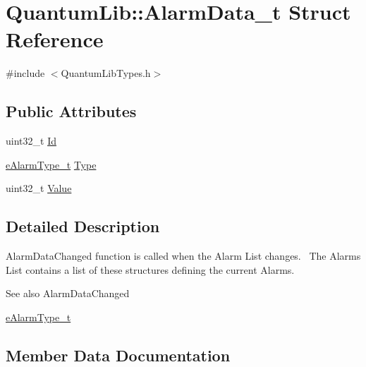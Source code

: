 \hypertarget{struct_quantum_lib_1_1_alarm_data__t}{}\section{Quantum\+Lib\+:\+:Alarm\+Data\+\_\+t Struct Reference}
\label{struct_quantum_lib_1_1_alarm_data__t}


{\ttfamily \#include $<$Quantum\+Lib\+Types.\+h$>$}

\subsection*{Public Attributes}
\begin{DoxyCompactItemize}
\item 
uint32\+\_\+t \mbox{\hyperlink{struct_quantum_lib_1_1_alarm_data__t_af08f24b08885bf73f3859685fae1662b}{Id}}
\item 
\mbox{\hyperlink{namespace_quantum_lib_a63dd10ad28888fcad99c7b8c5f155750}{e\+Alarm\+Type\+\_\+t}} \mbox{\hyperlink{struct_quantum_lib_1_1_alarm_data__t_afe1936d9430e6396dda2d40542e860ad}{Type}}
\item 
uint32\+\_\+t \mbox{\hyperlink{struct_quantum_lib_1_1_alarm_data__t_a067e24594147d5365c3b57e4920467bd}{Value}}
\end{DoxyCompactItemize}


\subsection{Detailed Description}
Alarm\+Data\+Changed function is called when the Alarm List changes.~\newline
The Alarms List contains a list of these structures defining the current Alarms. \begin{DoxySeeAlso}{See also}
Alarm\+Data\+Changed 

\mbox{\hyperlink{namespace_quantum_lib_a63dd10ad28888fcad99c7b8c5f155750}{e\+Alarm\+Type\+\_\+t}} 
\end{DoxySeeAlso}


\subsection{Member Data Documentation}
\mbox{\label{struct_quantum_lib_1_1_alarm_data__t_af08f24b08885bf73f3859685fae1662b}} 
